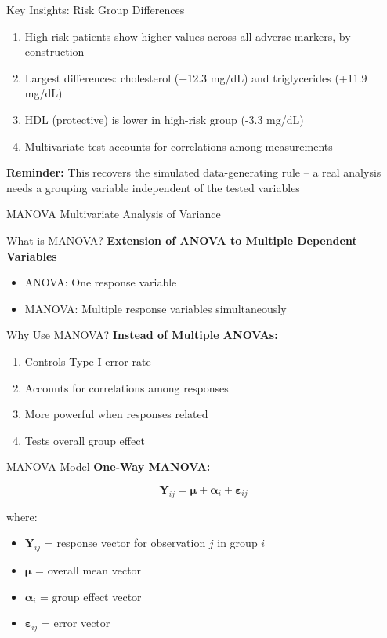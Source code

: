 \documentclass[aspectratio=169,ignorenonframetext]{beamer}
\begin{document}
\begin{frame}{Key Insights: Risk Group Differences}
\begin{enumerate}
\item
  High-risk patients show higher values across all adverse markers, by
  construction
\item
  Largest differences: cholesterol (+12.3 mg/dL) and triglycerides
  (+11.9 mg/dL)
\item
  HDL (protective) is lower in high-risk group (-3.3 mg/dL)
\item
  Multivariate test accounts for correlations among measurements
\end{enumerate}

\textbf{Reminder:} This recovers the simulated data-generating rule -- a
real analysis needs a grouping variable independent of the tested
variables
\end{frame}

\begin{frame}{MANOVA}
Multivariate Analysis of Variance
\end{frame}

\begin{frame}{What is MANOVA?}
\textbf{Extension of ANOVA to Multiple Dependent Variables}

\begin{itemize}
\item
  ANOVA: One response variable
\item
  MANOVA: Multiple response variables simultaneously
\end{itemize}
\end{frame}

\begin{frame}{Why Use MANOVA?}
\textbf{Instead of Multiple ANOVAs:}

\begin{enumerate}
\item
  Controls Type I error rate
\item
  Accounts for correlations among responses
\item
  More powerful when responses related
\item
  Tests overall group effect
\end{enumerate}
\end{frame}

\begin{frame}{MANOVA Model}
\textbf{One-Way MANOVA:}

\[\mathbf{Y}_{ij} = \mathbf{\mu} + \mathbf{\alpha}_{i} + \mathbf{\varepsilon}_{ij}\]

where:

\begin{itemize}
\item
  \(\mathbf{Y}_{ij}\) = response vector for observation \(j\) in group
  \(i\)
\item
  \(\mathbf{\mu}\) = overall mean vector
\item
  \(\mathbf{\alpha}_{i}\) = group effect vector
\item
  \(\mathbf{\varepsilon}_{ij}\) = error vector
\end{itemize}
\end{frame}
\end{document}
